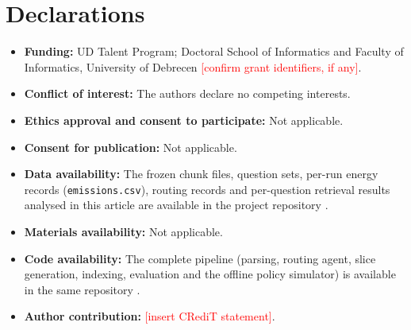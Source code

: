 \documentclass[pdflatex,sn-mathphys-num]{sn-jnl}
\newcommand{\todo}[1]{\textcolor{red}{#1}}
\theoremstyle{thmstyleone}%
\theoremstyle{thmstylethree}%
\begin{document}
\section{Declarations}

\begin{itemize}
\item \textbf{Funding:} UD Talent Program; Doctoral School of Informatics and Faculty of Informatics, University of Debrecen \todo{[confirm grant identifiers, if any]}.
\item \textbf{Conflict of interest:} The authors declare no competing interests.
\item \textbf{Ethics approval and consent to participate:} Not applicable.
\item \textbf{Consent for publication:} Not applicable.
\item \textbf{Data availability:} The frozen chunk files, question sets, per-run energy records (\texttt{emissions.csv}), routing records and per-question retrieval results analysed in this article are available in the project repository \cite{sandor2025documentslicecontextualretrieval}.
\item \textbf{Materials availability:} Not applicable.
\item \textbf{Code availability:} The complete pipeline (parsing, routing agent, slice generation, indexing, evaluation and the offline policy simulator) is available in the same repository \cite{sandor2025documentslicecontextualretrieval}.
\item \textbf{Author contribution:} \todo{[insert CRediT statement]}.
\end{itemize}


\end{document}
